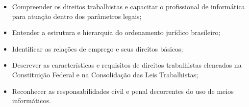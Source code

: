 \begin{itemize}

\item Compreender os direitos trabalhistas e capacitar o profissional de informática para atuação dentro dos parâmetros legais;

\item Entender a estrutura e hierarquia do ordenamento jurídico brasileiro;

\item Identificar as relações de emprego e seus direitos básicos;

\item Descrever as características e requisitos de direitos trabalhistas elencados na Constituição Federal e na Consolidação das Leis Trabalhistas;

\item Reconhecer as responsabilidades civil e penal decorrentes do uso de meios informáticos.

\end{itemize}









